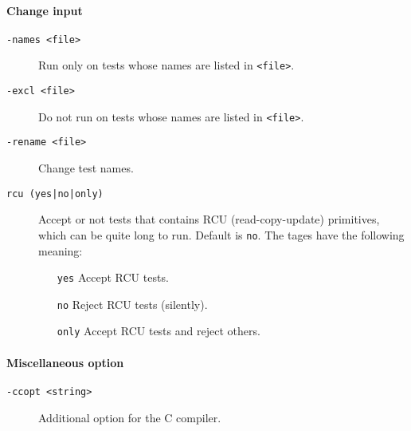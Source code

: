 \paragraph*{Change input}
\begin{description}
\item[{\tt -names <file>}] Run \litmus{} only on tests whose names are
listed in \texttt{<file>}.
\item[{\tt -excl <file>}] Do not run \litmus{} on tests whose names are
listed in \texttt{<file>}.
\item[{\tt -rename <file>}] Change test names.
\item[{\tt rcu (yes|no|only)}]
Accept or not tests that contains RCU (read-copy-update) primitives,
which can be quite long to run. Default is \texttt{no}.
The tages have the following meaning:
\begin{enumerate}
\item[{\tt yes}] Accept RCU tests.
\item[{\tt no}] Reject  RCU tests (silently).
\item[{\tt only}] Accept RCU tests and reject others.
\end{enumerate}
\end{description}

\paragraph*{Miscellaneous option}
\begin{description}
\item[{\tt -ccopt <string>}]Additional option for the C compiler.
\end{description}
